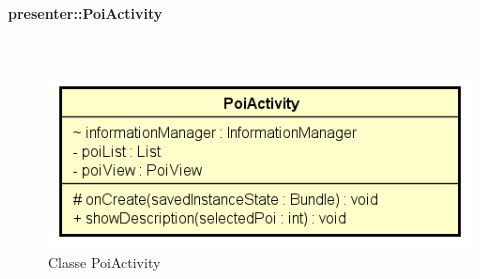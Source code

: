 \documentclass[../DefinizioneDiProdotto.tex]{subfiles}
\begin{document}
\paragraph{presenter::PoiActivity}
\
\begin{figure}[H]
	\centering
	\includegraphics[width=\maxwidth]{img/PoiActivity.png}
	\caption{Classe PoiActivity}\label{fig:presenter::PoiActivity} 
\end{figure}
\end{document}

